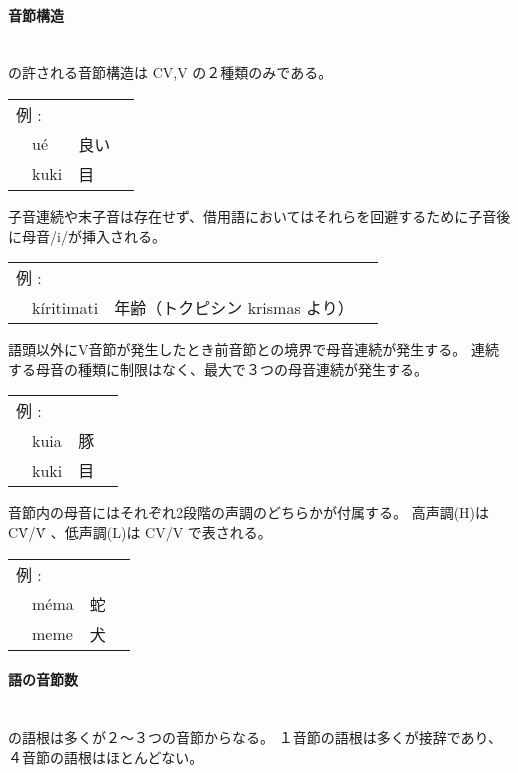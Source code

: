 \paragraph{音節構造}\quad\\
\langname の許される音節構造は CV,V の２種類のみである。

\begin{tabular}{llll}
    \multicolumn{2}{l}{例 : } \\ 
    & u\'e & 良い \\
    & kuki & 目 \\
\end{tabular}

子音連続や末子音は存在せず、借用語においてはそれらを回避するために子音後に母音/i/が挿入される。

\begin{tabular}{llll}
    \multicolumn{2}{l}{例 : } \\ 
    & k\'iritimati & 年齢（トクピシン krismas より） \\
\end{tabular}

語頭以外にV音節が発生したとき前音節との境界で母音連続が発生する。
連続する母音の種類に制限はなく、最大で３つの母音連続が発生する。

\begin{tabular}{llll}
    \multicolumn{2}{l}{例 : } \\ 
    & kuia & 豚 \\
    & kuki & 目 \\
\end{tabular}

音節内の母音にはそれぞれ2段階の声調のどちらかが付属する。
高声調(H)は C\'V/\'V 、低声調(L)は CV/V で表される。

\begin{tabular}{llll}
    \multicolumn{2}{l}{例 : } \\ 
    & m\'ema & 蛇 \\
    & meme & 犬 \\
\end{tabular}

\paragraph{語の音節数}\quad\\
\langname の語根は多くが２～３つの音節からなる。
１音節の語根は多くが接辞であり、４音節の語根はほとんどない。

